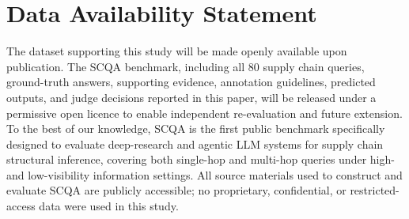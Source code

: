\documentclass{article}
\begin{document}
\section*{Data Availability Statement}

The dataset supporting this study will be made openly available upon publication. The SCQA benchmark, including all 80 supply chain queries, ground-truth answers, supporting evidence, annotation guidelines, predicted outputs, and judge decisions reported in this paper, will be released under a permissive open licence to enable independent re-evaluation and future extension. To the best of our knowledge, SCQA is the first public benchmark specifically designed to evaluate deep-research and agentic LLM systems for supply chain structural inference, covering both single-hop and multi-hop queries under high- and low-visibility information settings. All source materials used to construct and evaluate SCQA are publicly accessible; no proprietary, confidential, or restricted-access data were used in this study.



\end{document}
